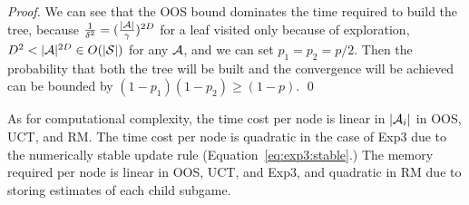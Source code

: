 {\begin{proof}
We can see that the OOS bound dominates the time required to build the tree, because $\frac{1}{\delta^2}=(\frac{|\mathcal{A}|}{\gamma})^{2D}$ for a leaf visited only because of exploration, $D^2 < |\mathcal{A}|^{2D} \in O(|\mathcal{S}|)$ for any $\mathcal{A}$, and we can set $p_1=p_2=p/2$. Then the probability that both the tree will be built and the convergence will be achieved can be bounded by $(1-p_1)(1-p_2) \geq (1-p)$. \qed
\end{proof}


As for computational complexity, the time cost per node is linear in $|\mathcal{A}_i|$ in OOS, UCT, and RM. The time cost per node
is quadratic in the case
of Exp3 due to the numerically stable update rule (Equation~\ref{eq:exp3:stable}.) 
The memory required per node is linear in OOS, UCT, and Exp3, and quadratic in RM due to storing estimates of each child subgame.
}


